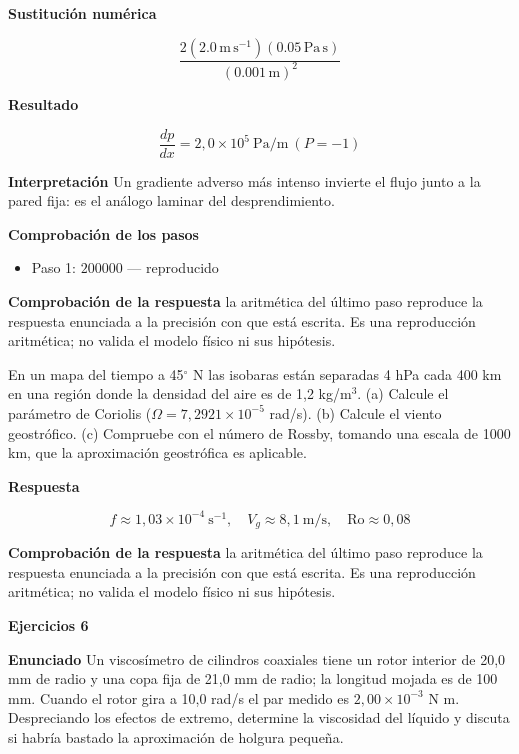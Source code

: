 \documentclass[10pt,openany]{book}
\begin{document}
\noindent\textbf{Sustitución numérica}

\[
\frac{2 \left(2.0\,\mathrm{m}\,\mathrm{s}^{-1}\right) \left(0.05\,\mathrm{Pa}\,\mathrm{s}\right)}{\left(0.001\,\mathrm{m}\right)^{2}}
\]

\noindent\textbf{Resultado}

\[
\frac{dp}{dx} = 2{,}0\times 10^{5}\ \mathrm{Pa/m}\ (P = -1)
\]

\noindent\textbf{Interpretación}
Un gradiente adverso más intenso invierte el flujo junto a la pared fija: es el análogo laminar del desprendimiento.

\noindent\textbf{Comprobación de los pasos}
\begin{itemize}
\item Paso 1: $200000$ — reproducido
\end{itemize}

\noindent\textbf{Comprobación de la respuesta} la aritmética del último paso reproduce la respuesta enunciada a la precisión con que está escrita. Es una reproducción aritmética; no valida el modelo físico ni sus hipótesis.

En un mapa del tiempo a 45\(^\circ\) N las isobaras están separadas 4 hPa cada 400 km en una región donde la densidad del aire es de 1,2 kg/m\(^3\). (a) Calcule el parámetro de Coriolis (\(\Omega = 7{,}2921\times 10^{-5}\) rad/s). (b) Calcule el viento geostrófico. (c) Compruebe con el número de Rossby, tomando una escala de 1000 km, que la aproximación geostrófica es aplicable.

\noindent\textbf{Respuesta}

\[
f \approx 1{,}03\times 10^{-4}\ \mathrm{s^{-1}},\quad V_g \approx 8{,}1\ \mathrm{m/s},\quad \mathrm{Ro} \approx 0{,}08
\]

\noindent\textbf{Comprobación de la respuesta} la aritmética del último paso reproduce la respuesta enunciada a la precisión con que está escrita. Es una reproducción aritmética; no valida el modelo físico ni sus hipótesis.

\noindent\textbf{Ejercicios 6}

\noindent\textbf{Enunciado}
Un viscosímetro de cilindros coaxiales tiene un rotor interior de 20,0 mm de radio y una copa fija de 21,0 mm de radio; la longitud mojada es de 100 mm. Cuando el rotor gira a 10,0 rad/s el par medido es \(2{,}00\times 10^{-3}\) N m. Despreciando los efectos de extremo, determine la viscosidad del líquido y discuta si habría bastado la aproximación de holgura pequeña.
\end{document}
